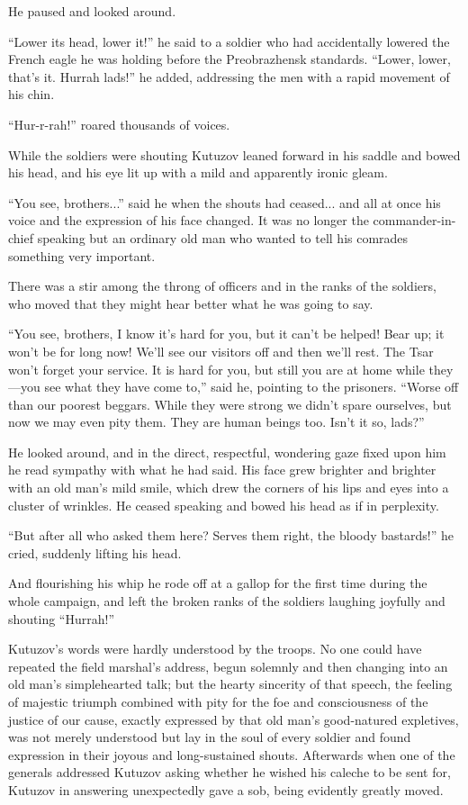 He paused and looked around.

``Lower its head, lower it!'' he said to a soldier who had
accidentally lowered the French eagle he was holding before the
Preobrazhensk standards. ``Lower, lower, that's it. Hurrah
lads!''  he added, addressing the men with a rapid movement of
his chin.

``Hur-r-rah!'' roared thousands of voices.

While the soldiers were shouting Kutuzov leaned forward in his
saddle and bowed his head, and his eye lit up with a mild and
apparently ironic gleam.

``You see, brothers...'' said he when the shouts had
ceased... and all at once his voice and the expression of his
face changed. It was no longer the commander-in-chief speaking
but an ordinary old man who wanted to tell his comrades something
very important.

There was a stir among the throng of officers and in the ranks of
the soldiers, who moved that they might hear better what he was
going to say.

``You see, brothers, I know it's hard for you, but it can't be
helped!  Bear up; it won't be for long now! We'll see our
visitors off and then we'll rest. The Tsar won't forget your
service. It is hard for you, but still you are at home while
they---you see what they have come to,'' said he, pointing to the
prisoners. ``Worse off than our poorest beggars.  While they were
strong we didn't spare ourselves, but now we may even pity
them. They are human beings too. Isn't it so, lads?''

He looked around, and in the direct, respectful, wondering gaze
fixed upon him he read sympathy with what he had said. His face
grew brighter and brighter with an old man's mild smile, which
drew the corners of his lips and eyes into a cluster of
wrinkles. He ceased speaking and bowed his head as if in
perplexity.

``But after all who asked them here? Serves them right, the
bloody bastards!'' he cried, suddenly lifting his head.

And flourishing his whip he rode off at a gallop for the first
time during the whole campaign, and left the broken ranks of the
soldiers laughing joyfully and shouting ``Hurrah!''

Kutuzov's words were hardly understood by the troops. No one
could have repeated the field marshal's address, begun solemnly
and then changing into an old man's simplehearted talk; but the
hearty sincerity of that speech, the feeling of majestic triumph
combined with pity for the foe and consciousness of the justice
of our cause, exactly expressed by that old man's good-natured
expletives, was not merely understood but lay in the soul of
every soldier and found expression in their joyous and
long-sustained shouts. Afterwards when one of the generals
addressed Kutuzov asking whether he wished his caleche to be sent
for, Kutuzov in answering unexpectedly gave a sob, being
evidently greatly moved.

